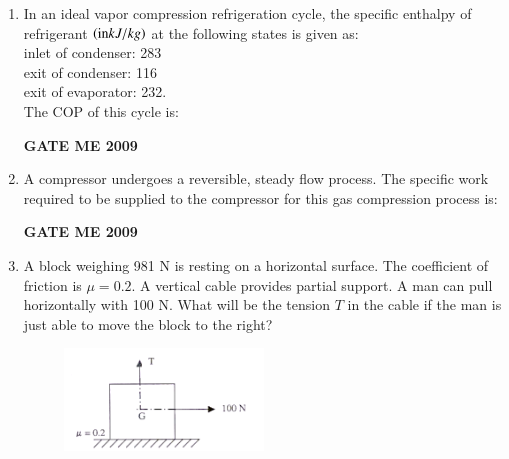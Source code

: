 \documentclass[journal]{IEEEtran}
\begin{document}
\begin{enumerate}[leftmargin=0pt]
\item In an ideal vapor compression refrigeration cycle, the specific enthalpy of refrigerant $\left(\text{in} kJ/kg\right)$ at the following states is given as: \\inlet of condenser: 283 \\exit of condenser: 116\\ exit of evaporator: 232.\\ The COP of this cycle is:
  \begin{enumerate}
  \end{enumerate}
  \hfill{\textbf{GATE ME 2009}}

\item A compressor undergoes a reversible, steady flow process. The specific work required to be supplied to the compressor for this gas compression process is:
  \begin{enumerate}
  \end{enumerate}
  \hfill{\textbf{GATE ME 2009}}


\item A block weighing 981 N is resting on a horizontal surface. The coefficient of friction is $\mu=0.2$. A vertical cable provides partial support. A man can pull horizontally with 100 N. What will be the tension $T$  in the cable if the man is just able to move the block to the right?

    \begin{figure}[h]
      \centering
      \includegraphics[width=0.5\textwidth]{Figs/image (2).png}
      \caption{}
    \end{figure}




\end{enumerate}
\end{document}
